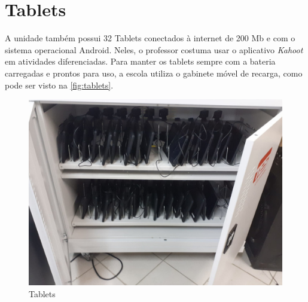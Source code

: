 \section{Tablets}
A unidade também possui 32 Tablets conectados à internet de 200 Mb e com o sistema operacional Android. Neles, o professor costuma usar o aplicativo \emph{Kahoot} em atividades diferenciadas. Para manter os tablets sempre com a bateria carregadas e prontos para uso, a escola utiliza o gabinete móvel de recarga, como pode ser visto na \autoref{fig:tablets}.
\begin{figure}[!ht]
\vspace{8pt}
    \begin{center}
        \includegraphics[width=.8\textwidth]{03-elementos/03.2_textual/03.2.1_fig/tablets.jpeg} 
        \caption{Tablets}
        \label{fig:tablets}    
    \end{center}
\end{figure}
